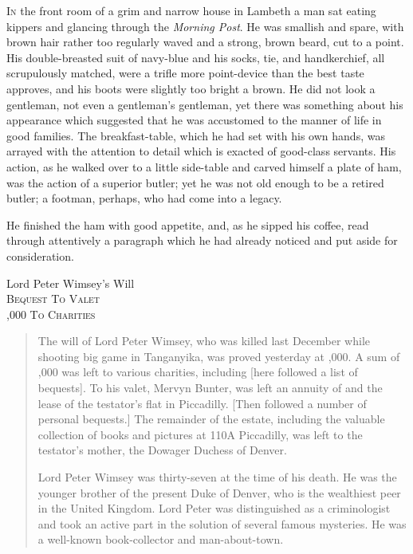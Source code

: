 
\lettrine[lines=4]{I}{n} the front room of a grim and narrow house in Lambeth a man sat eating kippers and glancing through the \textit{Morning Post}. He was smallish and spare, with brown hair rather too regularly waved and a strong, brown beard, cut to a point. His double-breasted suit of navy-blue and his socks, tie, and handkerchief, all scrupulously matched, were a trifle more point-device than the best taste approves, and his boots were slightly too bright a brown. He did not look a gentleman, not even a gentleman's gentleman, yet there was something about his appearance which suggested that he was accustomed to the manner of life in good families. The breakfast-table, which he had set with his own hands, was arrayed with the attention to detail which is exacted of good-class servants. His action, as he walked over to a little side-table and carved himself a plate of ham, was the action of a superior butler; yet he was not old enough to be a retired butler; a footman, perhaps, who had come into a legacy.

He finished the ham with good appetite, and, as he sipped his coffee, read through attentively a paragraph which he had already noticed and put aside for consideration.

\begin{center}
Lord Peter Wimsey's Will\\
\textsc{Bequest To Valet\\
,000 To Charities}
\end{center}

\begin{quotation}
The will of Lord Peter Wimsey, who was killed last December while shooting big game in Tanganyika, was proved yesterday at ,000. A sum of ,000 was left to various charities, including [here followed a list of bequests]. To his valet, Mervyn Bunter, was left an annuity of  and the lease of the testator's flat in Piccadilly. [Then followed a number of personal bequests.] The remainder of the estate, including the valuable collection of books and pictures at 110A Piccadilly, was left to the testator's mother, the Dowager Duchess of Denver.

Lord Peter Wimsey was thirty-seven at the time of his death. He was the younger brother of the present Duke of Denver, who is the wealthiest peer in the United Kingdom. Lord Peter was distinguished as a criminologist and took an active part in the solution of several famous mysteries. He was a well-known book-collector and man-about-town.
\end{quotation}

